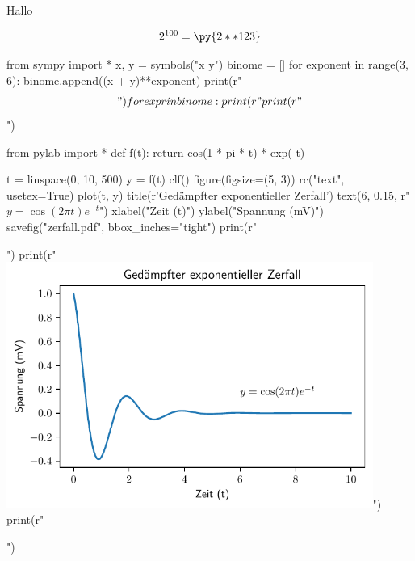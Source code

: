 \documentclass[12pt,ngerman]{scrartcl}
\begin{document}
Hallo


\[
2^{100}=\py{2**123}
\]

\begin{pycode}
from sympy import *
x, y = symbols("x y")
binome = []
for exponent in range(3, 6):
    binome.append((x + y)**exponent)
    print(r"\begin{align*}")
    for expr in binome:
        print(r"%
    print(r"\end{align*}")
\end{pycode}

\begin{pycode}
from pylab import *
def f(t):
    return cos(1 * pi * t) * exp(-t)

t = linspace(0, 10, 500)
y = f(t)
clf()
figure(figsize=(5, 3))
rc("text", usetex=True)
plot(t, y)
title(r'Ged\"ampfter exponentieller Zerfall') 
text(6, 0.15, r"$y = \cos(2 \pi t) e^{-t}$")
xlabel("Zeit (t)")
ylabel("Spannung (mV)")
savefig("zerfall.pdf", bbox_inches="tight")
print(r"\begin{center}")
print(r"\includegraphics[width=0.9\textwidth]{zerfall.pdf}")
print(r"\end{center}")
\end{pycode}
\end{document}
